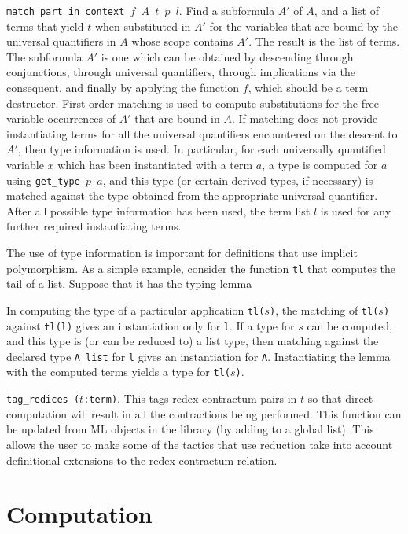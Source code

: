 {\tt match\_part\_in\_context $f$ $A$ $t$ $p$ $l$}.  Find a subformula
$A'$ of $A$, and a list of terms that yield $t$ when substituted in $A'$ for
the variables that are bound by the universal quantifiers in $A$ whose scope
contains $A'$.  The result is the list of terms.  The subformula $A'$ is one
which can be obtained by descending through conjunctions, through universal
quantifiers, through implications via the consequent, and finally by
applying the function $f$, which should be a term destructor.
First-order matching is used to compute substitutions for the free variable
occurrences of $A'$ that are
bound in $A$.   
If matching does not provide instantiating terms
for all the universal quantifiers encountered on the descent to $A'$,
then type information is used.  In particular, for each universally quantified
variable $x$ which has been instantiated with a term $a$, a type is computed for
$a$ using {\tt get\_type $p$ $a$}, and this type (or certain derived types, if
necessary) is matched against the type obtained from the appropriate universal
quantifier.  After all possible type information has been used, the term list
$l$ is used for any further required instantiating terms.  

The use of type information is important for definitions that use implicit
polymorphism.  As a simple example, consider the function {\tt tl} that
computes the tail of a list.  Suppose that it has the typing lemma
\begin{Numath}
\end{Numath}%
In computing the type of a particular application {\tt tl($s$)},
the matching of {\tt tl($s$)} against {\tt tl(l)} gives an
instantiation only for {\tt l}.  If a type for $s$ can be computed, and this
type is (or can be reduced to) a list type, then matching against the declared
type {\tt A~list} for {\tt l} gives an instantiation for {\tt A}.  Instantiating
the lemma with the computed terms yields a type for {\tt tl($s$)}.

{\tt tag\_redices ($t$:term)}.  This tags redex-contractum pairs in $t$ so that
direct computation will result in all the contractions being performed.  This
function can be updated from ML objects in the library (by adding to a global
list).  This allows the user to make some of the tactics that use reduction take
into account definitional extensions to the redex-contractum relation.


\section{Computation}

